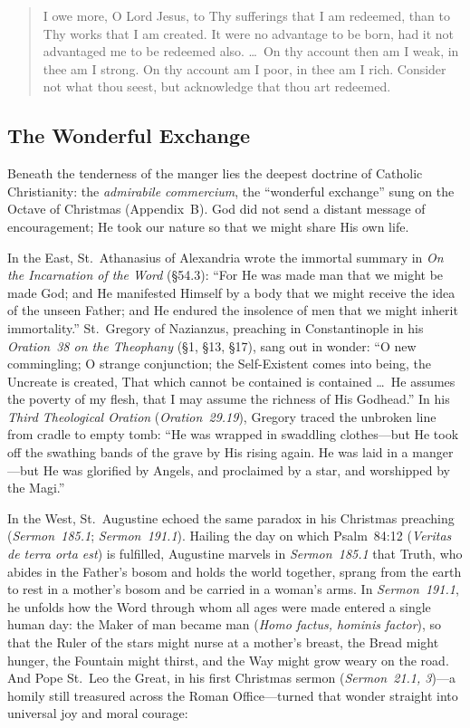 \begin{quote}
I owe more, O Lord Jesus, to Thy sufferings that I am redeemed, than to Thy works that I am created. It were no advantage to be born, had it not advantaged me to be redeemed also. \dots\ On thy account then am I weak, in thee am I strong. On thy account am I poor, in thee am I rich. Consider not what thou seest, but acknowledge that thou art redeemed.
\end{quote}

\subsection{The Wonderful Exchange}

Beneath the tenderness of the manger lies the deepest doctrine of Catholic Christianity: the \textit{admirabile commercium}, the ``wonderful exchange'' sung on the Octave of Christmas (Appendix~B). God did not send a distant message of encouragement; He took our nature so that we might share His own life.

In the East, St.~Athanasius of Alexandria wrote the immortal summary in \textit{On the Incarnation of the Word} (\S54.3): ``For He was made man that we might be made God; and He manifested Himself by a body that we might receive the idea of the unseen Father; and He endured the insolence of men that we might inherit immortality.'' St.~Gregory of Nazianzus, preaching in Constantinople in his \textit{Oration~38 on the Theophany} (\S1, \S13, \S17), sang out in wonder: ``O new commingling; O strange conjunction; the Self-Existent comes into being, the Uncreate is created, That which cannot be contained is contained \dots\ He assumes the poverty of my flesh, that I may assume the richness of His Godhead.'' In his \textit{Third Theological Oration} (\textit{Oration~29.19}), Gregory traced the unbroken line from cradle to empty tomb: ``He was wrapped in swaddling clothes---but He took off the swathing bands of the grave by His rising again. He was laid in a manger---but He was glorified by Angels, and proclaimed by a star, and worshipped by the Magi.''

In the West, St.~Augustine echoed the same paradox in his Christmas preaching (\textit{Sermon~185.1}; \textit{Sermon~191.1}). Hailing the day on which Psalm~84:12 (\textit{Veritas de terra orta est}) is fulfilled, Augustine marvels in \textit{Sermon~185.1} that Truth, who abides in the Father's bosom and holds the world together, sprang from the earth to rest in a mother's bosom and be carried in a woman's arms. In \textit{Sermon~191.1}, he unfolds how the Word through whom all ages were made entered a single human day: the Maker of man became man (\textit{Homo factus, hominis factor}), so that the Ruler of the stars might nurse at a mother's breast, the Bread might hunger, the Fountain might thirst, and the Way might grow weary on the road. And Pope St.~Leo the Great, in his first Christmas sermon (\textit{Sermon~21.1, 3})---a homily still treasured across the Roman Office---turned that wonder straight into universal joy and moral courage:

